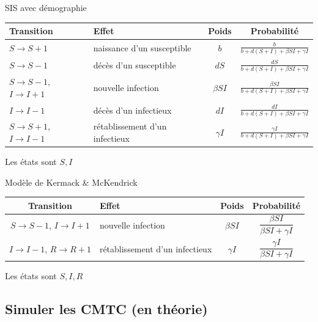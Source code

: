 \documentclass[aspectratio=169]{beamer}\usepackage[]{graphicx}\usepackage[]{xcolor}
\begin{document}
\begin{frame}{SIS avec démographie}
    \begin{center}
        \begin{tabular}{p{3cm}p{3cm}cc}
        \toprule
            Transition & Effet & Poids & Probabilité \\
          \midrule
            $S\to S+1$ & naissance d'un susceptible & $b$ & $\frac{b}{b+d(S+I)+\beta SI+\gamma I}$ \\
            $S\to S-1$ & décès d'un susceptible & $dS$ & $\frac{dS}{b+d(S+I)+\beta SI+\gamma I}$ \\
            $S\to S-1$, $I\to I+1$ & nouvelle infection & $\beta SI$ & $\frac{\beta SI}{b+d(S+I)+\beta SI+\gamma I}$ \\
            $I\to I-1$ & décès d'un infectieux & $dI$ & $\frac{dI}{b+d(S+I)+\beta SI+\gamma I}$ \\
            $S\to S+1$, $I\to I-1$ & rétablissement d'un infectieux & $\gamma I$ & $\frac{\gamma I}{b+d(S+I)+\beta SI+\gamma I}$ \\
            \bottomrule
        \end{tabular}
    \end{center}
\vfill
Les états sont $S,I$
\end{frame}


\begin{frame}[fragile]{Modèle de Kermack \& McKendrick}
    \begin{center}
        \begin{tabular}{cp{3cm}cc}
        \toprule
            Transition & Effet & Poids & Probabilité \\
            \midrule
            $S\to S-1$, $I\to I+1$ & nouvelle infection & $\beta SI$ & $\dfrac{\beta SI}{\beta SI+\gamma I}$ \\
            $I\to I-1$, $R\to R+1$ & rétablissement d'un infectieux & $\gamma I$ & $\dfrac{\gamma I}{\beta SI+\gamma I}$ \\
            \bottomrule
        \end{tabular}
    \end{center}
    \vfill
    Les états sont $S,I,R$
\end{frame}


\subsection{Simuler les CMTC (en théorie)}
\end{document}
